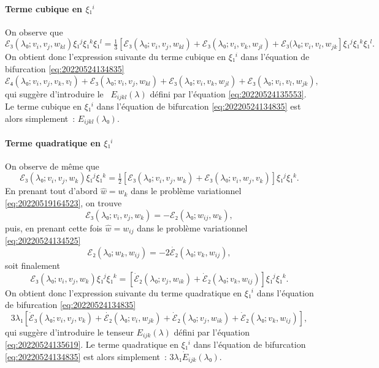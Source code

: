 \documentclass[12pt, final]{amsart}
\theoremstyle{definition}
\begin{document}
\paragraph{Terme cubique en \(ξ₁^i\)}On observe que
\begin{equation} ℰ₃(λ₀ ; v_i, v_j, w_{k l}) ξ₁^j ξ₁^k
  ξ₁^l = \text{} \tfrac{1}{3} [ℰ₃(λ₀ ; v_i, v_j, w_{k
  l}) +ℰ₃(λ₀ ; v_i, v_k, w_{j
  l}) +ℰ₃(λ₀ ; v_i, v_l, w_{j k}] ξ₁^j ξ₁^k
  ξ₁^l . \end{equation}
On obtient donc l'expression suivante du terme cubique en \(ξ₁^i\) dans l'équation de bifurcation \eqref{eq:20220524134835}
\begin{equation} ℰ₄(λ₀ ; v_i, v_j, v_k, v_l) +ℰ₃(λ₀ ;
  v_i, v_j, w_{k l}) +ℰ₃(λ₀ ; v_i, v_k, w_{j
  l}) +ℰ₃(λ₀ ; v_i, v_l, w_{j k}), \end{equation}
qui suggère d'introduire le \ \(E_{i j k l}(λ)\) défini par l'équation \eqref{eq:20220524135553}. Le terme cubique en \(ξ₁^i\) dans l'équation de bifurcation \eqref{eq:20220524134835} est alors simplement~: \(E_{i j k l}(λ₀)\).

\paragraph{Terme quadratique en \(ξ₁^i\)}On observe de même que
\begin{equation} ℰ₃(λ₀ ; v_i, v_j, w_k) ξ₁^j ξ₁^k = \tfrac{1}{2}
  [ℰ₃(λ₀ ; v_i, v_j, w_k) +ℰ₃(λ₀ ; v_i,
  w_j, v_k)] ξ₁^j ξ₁^k . \end{equation}
En prenant tout d'abord \(\widehat{w} = w_k\) dans le problème variationnel \eqref{eq:20220519164523}, on trouve
\begin{equation} ℰ₃(λ₀ ; v_i, v_j, w_k) = -ℰ₂(λ₀ ;
  w_{i j}, w_k), \end{equation}
puis, en prenant cette fois \(\hat{w} = w_{i j}\) dans le problème variationnel \eqref{eq:20220524134525}
\begin{equation} ℰ₂(λ₀ ; w_k, w_{i j}) = - 2 \dot{ℰ₂}
 (λ₀ ; v_k, w_{i j}), \end{equation}
soit finalement
\begin{equation} ℰ₃(λ₀ ; v_i, v_j, w_k) ξ₁^j ξ₁^k =
  [\dot{ℰ}₂(λ₀ ; v_j, w_{i k}) +
  \dot{ℰ}₂(λ₀ ; v_k, w_{i j})] ξ₁^j ξ₁^k .
\end{equation}
On obtient donc l'expression suivante du terme quadratique en \(ξ₁^i\) dans l'équation de bifurcation \eqref{eq:20220524134835}
\begin{equation} 3 λ₁ [\dot{ℰ}₃(λ₀ ; v_i, v_j, v_k) +
  \dot{ℰ₂}(λ₀ ; v_i, w_{j k}) +
  \dot{ℰ}₂(λ₀ ; v_j, w_{i k}) +
  \dot{ℰ}₂(λ₀ ; v_k, w_{i j})], \end{equation}
qui suggère d'introduire le tenseur \(E_{i j k}(λ)\) défini par l'équation \eqref{eq:20220524135619}. Le terme quadratique en \(ξ₁^i\) dans l'équation de bifurcation \eqref{eq:20220524134835} est alors simplement~: \(3 λ₁ \dot{E}_{i j k}(λ₀)\).
\end{document}
